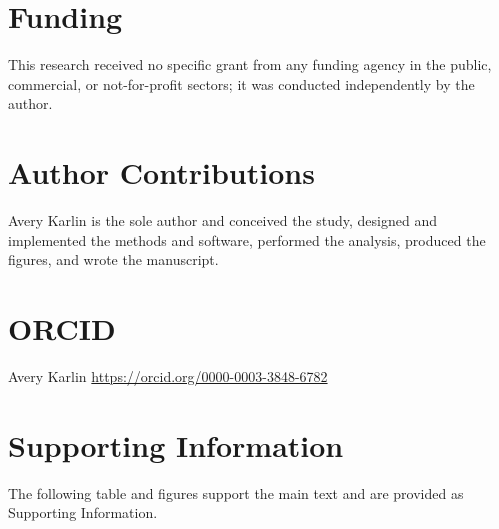 \documentclass[11pt]{article}
\begin{document}
\section*{Funding}
This research received no specific grant from any funding agency in the public,
commercial, or not-for-profit sectors; it was conducted independently by the
author.

\section*{Author Contributions}
Avery Karlin is the sole author and conceived the study, designed and implemented
the methods and software, performed the analysis, produced the figures, and wrote
the manuscript.

\section*{ORCID}
Avery Karlin \quad \href{https://orcid.org/0000-0003-3848-6782}{https://orcid.org/0000-0003-3848-6782}




\clearpage
\renewcommand{\thefigure}{S\arabic{figure}}
\setcounter{figure}{0}
\section*{Supporting Information}
\noindent The following table and figures support the main text and are provided as
Supporting Information.
\end{document}
